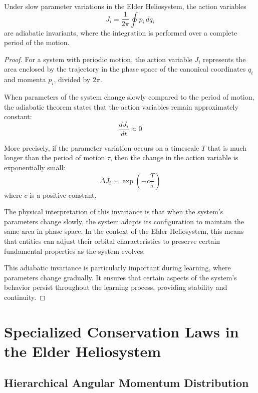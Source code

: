 \begin{theorem}
Under slow parameter variations in the Elder Heliosystem, the action variables
\begin{equation}
J_i = \frac{1}{2\pi} \oint p_i \, dq_i
\end{equation}
are adiabatic invariants, where the integration is performed over a complete period of the motion.
\end{theorem}

\begin{proof}
For a system with periodic motion, the action variable $J_i$ represents the area enclosed by the trajectory in the phase space of the canonical coordinates $q_i$ and momenta $p_i$, divided by $2\pi$.

When parameters of the system change slowly compared to the period of motion, the adiabatic theorem states that the action variables remain approximately constant:
\begin{equation}
\frac{dJ_i}{dt} \approx 0
\end{equation}

More precisely, if the parameter variation occurs on a timescale $T$ that is much longer than the period of motion $\tau$, then the change in the action variable is exponentially small:
\begin{equation}
\Delta J_i \sim \exp\left(-c \frac{T}{\tau}\right)
\end{equation}
where $c$ is a positive constant.

The physical interpretation of this invariance is that when the system's parameters change slowly, the system adapts its configuration to maintain the same area in phase space. In the context of the Elder Heliosystem, this means that entities can adjust their orbital characteristics to preserve certain fundamental properties as the system evolves.

This adiabatic invariance is particularly important during learning, where parameters change gradually. It ensures that certain aspects of the system's behavior persist throughout the learning process, providing stability and continuity.
\end{proof}

\section{Specialized Conservation Laws in the Elder Heliosystem}

\subsection{Hierarchical Angular Momentum Distribution}

